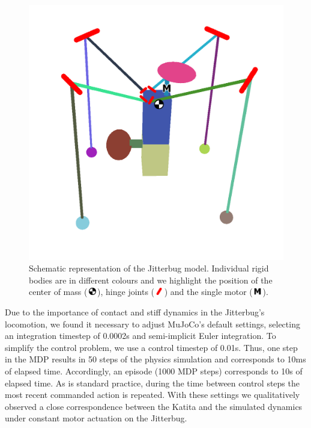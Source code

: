 \documentclass[letterpaper, 10 pt, conference]{ieeeconf}
\newcommand{\com}{\,\includegraphics[width=9pt]{ico-com}\,}
\newcommand{\hinge}{\,\includegraphics[width=9pt]{ico-hinge}\,}
\newcommand{\motor}{\,\includegraphics[width=9pt]{ico-motor}\,}
\begin{document}
\begin{figure}[ht]
    \centering
    \includegraphics[width=\linewidth]{fig-jitterbug-parts}
    \caption[
        Schematic representation of the Jitterbug model.
        Individual rigid bodies are in different colours and we highlight the position of the center of mass, hinge joints and the single motor.
    ]{
        Schematic representation of the Jitterbug model.
        Individual rigid bodies are in different colours and we highlight the position of the center of mass (\protect\com), hinge joints  (\protect\hinge) and the single motor (\protect\motor).
    }
    \label{fig:parts}
\end{figure}

Due to the importance of contact and stiff dynamics in the Jitterbug's locomotion, we found it necessary to adjust MuJoCo's default settings, selecting an integration timestep of 0.0002s and semi-implicit Euler integration.
To simplify the control problem, we use a control timestep of 0.01s.
Thus, one step in the MDP results in 50 steps of the physics simulation and corresponds to 10ms of elapsed time.
Accordingly, an episode (1000 MDP steps) corresponds to 10s of elapsed time.
As is standard practice, during the time between control steps the most recent commanded action is repeated.
With these settings we qualitatively observed a close correspondence between the Katita and the simulated dynamics under constant motor actuation on the Jitterbug.
\end{document}
